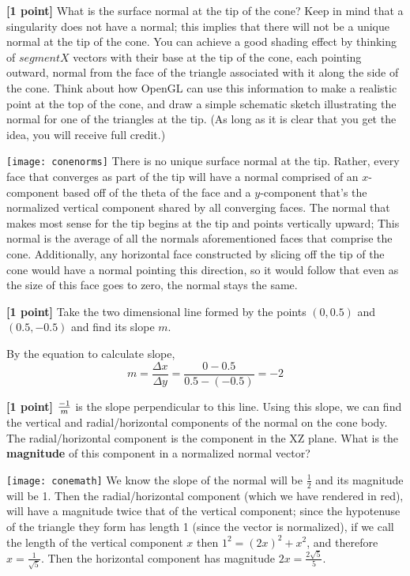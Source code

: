 \documentclass[10pt,twocolumn]{article}
\begin{document}
{\bf [1 point]} What is the surface normal at the tip of the cone? Keep in mind that a singularity does not have a normal; this implies that there will not be a unique normal at the tip of the cone. You can achieve a good shading effect by thinking of $segmentX$ vectors with their base at the tip of the cone, each pointing outward, normal from the face of the triangle associated with it along the side of the cone. Think about how OpenGL can use this information to make a realistic point at the top of the cone, and draw a simple schematic sketch illustrating the normal for one of the triangles at the tip. (As long as it is clear that you get the idea, you will receive full credit.)
\begin{framed}
\centering
\texttt{[image: conenorms]}
There is no unique surface normal at the tip. Rather, every face that converges as part of the tip will have a normal comprised of an $x$-component based off of the theta of the face and a $y$-component that's the normalized vertical component shared by all converging faces. The normal that makes most sense for the tip begins at the tip and points vertically upward; This normal is the average of all the normals aforementioned faces that comprise the cone.
Additionally, any horizontal face constructed by slicing off the tip of the cone would have a normal pointing this direction, so it would follow that even as the size of this face goes to zero, the normal stays the same.
\end{framed}

{\bf [1 point]} Take the two dimensional line formed by the points $(0, 0.5)$ and $(0.5, -0.5)$ and find its slope $m$.
\begin{framed}
By the equation to calculate slope,
\[m = \frac{\Delta x}{\Delta y} = \frac{0 - 0.5}{0.5 - (-0.5)} = -2\]
\end{framed}


{\bf [1 point]} ${{-1}\over{m}}$ is the slope perpendicular to this line. Using this slope, we
can find the vertical and radial/horizontal components of the normal on the cone body. The radial/horizontal component is the component in the XZ plane. What is the {\bf magnitude} of this component in a normalized normal vector?
\begin{framed}
\centering
\texttt{[image: conemath]}
We know the slope of the normal will be $\frac{1}{2}$ and its magnitude will be 1. Then the radial/horizontal component (which we have rendered in red), will have a magnitude twice that of the vertical component; since the hypotenuse of the triangle they form has length 1 (since the vector is normalized), if we call the length of the vertical component $x$ then $1^2 = (2x)^2 + x^2$, and therefore $x = \frac{1}{\sqrt{5}}$. Then the horizontal component has magnitude $2x = \frac{2\sqrt{5}}{5}$. 
\end{framed}
\end{document}

